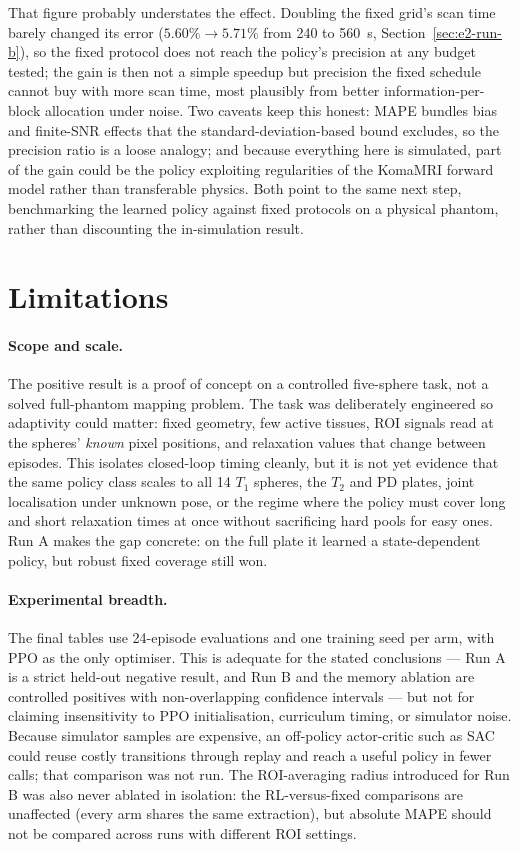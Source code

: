 That figure probably understates the effect. Doubling the fixed grid's scan time
barely changed its error ($5.60\% \to 5.71\%$ from 240 to 560~s,
Section~\ref{sec:e2-run-b}), so the fixed protocol does not reach the policy's
precision at any budget tested; the gain is then not a simple speedup but
precision the fixed schedule cannot buy with more scan time, most plausibly from
better information-per-block allocation under noise. Two caveats keep this
honest: MAPE bundles bias and finite-SNR effects that the
standard-deviation-based bound excludes, so the precision ratio is a loose
analogy; and because everything here is simulated, part of the gain could be the
policy exploiting regularities of the KomaMRI forward model rather than
transferable physics. Both point to the same next step, benchmarking the learned
policy against fixed protocols on a physical phantom, rather than discounting the
in-simulation result.

\section{Limitations}
\label{sec:e2-limitations}

\paragraph{Scope and scale.} The positive result is a proof of concept on a
controlled five-sphere task, not a solved full-phantom mapping problem. The task
was deliberately engineered so adaptivity could matter: fixed geometry, few
active tissues, ROI signals read at the spheres' \emph{known} pixel positions,
and relaxation values that change between episodes. This isolates closed-loop
timing cleanly, but it is not yet evidence that the same policy class scales to
all 14 $T_1$ spheres, the $T_2$ and PD plates, joint localisation under unknown
pose, or the regime where the policy must cover long and short relaxation times
at once without sacrificing hard pools for easy ones. Run A makes the gap
concrete: on the full plate it learned a state-dependent policy, but robust
fixed coverage still won.

\paragraph{Experimental breadth.} The final tables use 24-episode evaluations
and one training seed per arm, with PPO as the only optimiser. This is adequate
for the stated conclusions --- Run A is a strict held-out negative result, and
Run B and the memory ablation are controlled positives with non-overlapping
confidence intervals --- but not for claiming insensitivity to PPO
initialisation, curriculum timing, or simulator noise. Because simulator samples
are expensive, an off-policy actor-critic such as SAC could reuse costly
transitions through replay and reach a useful policy in fewer calls; that
comparison was not run. The ROI-averaging radius introduced for Run B was also
never ablated in isolation: the RL-versus-fixed comparisons are unaffected
(every arm shares the same extraction), but absolute MAPE should not be compared
across runs with different ROI settings.

